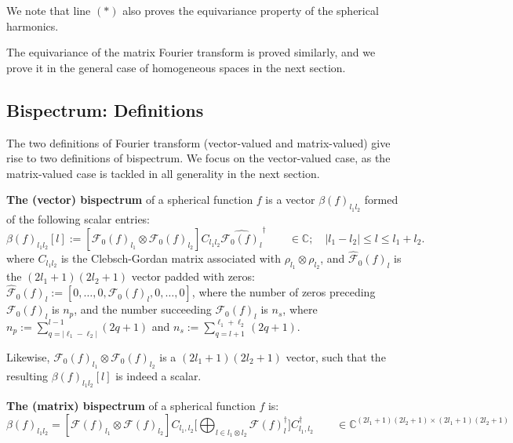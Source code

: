 \documentclass{article}
\begin{document}
We note that line $(*)$ also proves the equivariance property of the spherical harmonics.

The equivariance of the matrix Fourier transform is proved similarly, and we prove it in the general case of homogeneous spaces in the next section.

\subsection{Bispectrum: Definitions}

The two definitions of Fourier transform (vector-valued and matrix-valued) give rise to two definitions of bispectrum. We focus on the vector-valued case, as the matrix-valued case is tackled in all generality in the next section.

\textbf{The (vector) bispectrum} of a spherical function $f$ is a vector $\beta(f)_{l_1l_2}$ formed of the following scalar entries:
\begin{equation}
    \beta(f)_{l_1l_2}[l]:=\left[\mathcal{F}_0(f)_{l_1} \otimes \mathcal{F}_0(f)_{l_2} \right] C_{l_1l_2} \hat{\mathcal{F}_0(f)_l}^{\dagger} \qquad \in \mathbb{C}; \quad|l_1-l_2| \leq l \leq l_1+l_2.
\end{equation}
where $C_{l_1l_2}$ is the Clebsch-Gordan matrix associated with $\rho_{l_1} \otimes \rho_{l_2}$, and $\hat{\mathcal{F}}_0(f)_l$ is the $(2l_1+1)(2l_2+1)$ vector padded with zeros: $\hat{\mathcal{F}}_0(f)_l:=\left[0, \ldots, 0, \mathcal{F}_0(f)_l, 0, \ldots, 0\right]$, where the number of zeros preceding $\mathcal{F}_0(f)_l$ is $n_p$, and the number succeeding $\mathcal{F}_0(f)_l$ is $n_s$, where $n_p:=\sum_{q=|\ell_1-\ell_2|}^{l-1}(2 q+1)$ and $n_s:=\sum_{q=l+1}^{\ell_1+\ell_2}(2 q+1)$.

Likewise, $\mathcal{F}_0(f)_{l_1} \otimes \mathcal{F}_0(f)_{l_2}$ is a $(2l_1+1)(2l_2+1)$ vector, such that the resulting $\beta(f)_{l_1l_2}[l]$ is indeed a scalar.

\textbf{The (matrix) bispectrum} of a spherical function $f$ is:
\begin{equation}
    \beta(f)_{l_1l_2} = [\mathcal{F}(f)_{l_1} \otimes \mathcal{F}(f)_{l_2}] C_{l_1,l_2} \Big[ \bigoplus_{l \in l_1 \otimes l_2} \mathcal{F}(f)_{l}^{\dagger} \Big] C^{\dagger}_{l_1,l_2} \qquad \in \mathbb{C}^{(2l_1+1)(2l_2 + 1) \times (2l_1+1)(2l_2 +1)}
\end{equation}

\end{document}
